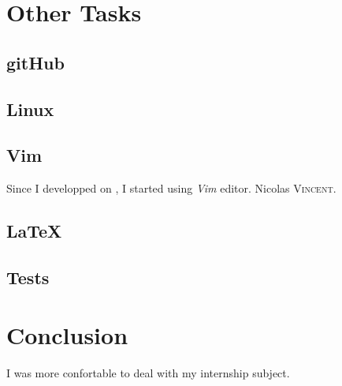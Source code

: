 \section{Other Tasks}\label{FillingFile}

\subsection{gitHub}

\subsection{Linux}

\subsection{Vim}

Since I developped on \rasp{}, I started using \emph{Vim} editor. Nicolas \textsc{Vincent}.

\subsection{\LaTeX}

\subsection{Tests}


\section{Conclusion}\label{Conclusion2}

I was more confortable to deal with my internship subject.

